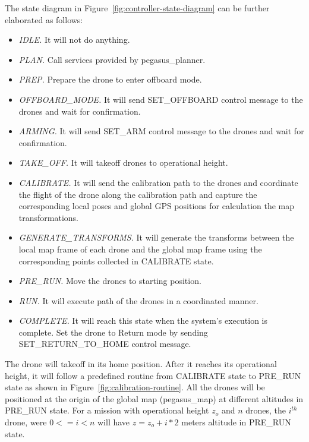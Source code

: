 The state diagram in Figure~\ref{fig:controller-state-diagram} can be further elaborated as follows:
\begin{itemize}
	\item \textit{IDLE.} It will not do anything.
	\item \textit{PLAN.} Call services provided by pegasus\_planner. 
	\item \textit{PREP.} Prepare the drone to enter offboard mode.
	\item \textit{OFFBOARD\_MODE.} It will send SET\_OFFBOARD control message to the drones and wait for confirmation.
	\item \textit{ARMING.} It will send SET\_ARM control message to the drones and wait for confirmation.
	\item \textit{TAKE\_OFF.} It will takeoff drones to operational height.
	\item \textit{CALIBRATE.} It will send the calibration path to the drones and coordinate the flight of the drone along the calibration path and capture the corresponding local poses and global GPS positions for calculation the map transformations.
	\item \textit{GENERATE\_TRANSFORMS.} It will generate the transforms between the local map frame of each drone and the global map frame using the corresponding points collected in CALIBRATE state.
	\item \textit{PRE\_RUN.} Move the drones to starting position.
	\item \textit{RUN.} It will execute path of the drones in a coordinated manner.
	\item \textit{COMPLETE.} It will reach this state when the system's execution is complete. Set the drone to Return mode by sending SET\_RETURN\_TO\_HOME control message.
\end{itemize}

The drone will takeoff in its home position. After it reaches its operational height, it will follow a predefined routine from CALIBRATE state to PRE\_RUN state as shown in Figure~\ref{fig:calibration-routine}.  All the drones will be positioned at the origin of the global map (pegasus\_map) at different altitudes in PRE\_RUN state. For a mission with operational height $z_o$ and $n$ drones, the $i^{th}$ drone, were $0 <= i < n$ will have $z = z_o + i * 2$ meters altitude in PRE\_RUN state. 

